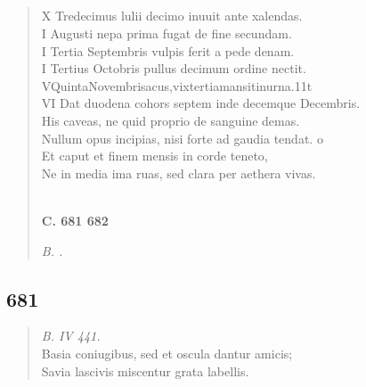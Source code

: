 \documentclass[11pt, a4paper]{report}
\begin{document}
            \subsection*{}
      \begin{verse}
      X Tredecimus lulii decimo inuuit ante xalendas. \\ I Augusti nepa prima fugat de fine secundam. \\  \lbrack  I Tertia Septembris vulpis ferit a pede denam. \\ I Tertius Octobris pullus decimum ordine nectit. \\ VQuintaNovembrisacus,vixtertiamansitinurna.11t \\ VI Dat duodena cohors septem inde decemque Decembris. \\ His caveas, ne quid proprio de sanguine demas. \\ Nullum opus incipias, nisi forte ad gaudia tendat. o \\ Et caput et finem mensis in corde teneto, \\ Ne in media ima ruas, sed clara per aethera vivas. \\ 
        ﻿\pagebreak 
     \marginpar{[158]} \begin{center} \textbf{C. 681 682} \end{center}\textit{B. .} \\ 
      \end{verse}
  
            \subsection*{681}
      \begin{verse}
      \textit{B. IV 441.} \\ Basia coniugibus, sed et oscula dantur amicis; \\ Savia lascivis miscentur grata labellis. \\ 
      \end{verse}
  
\end{document}
